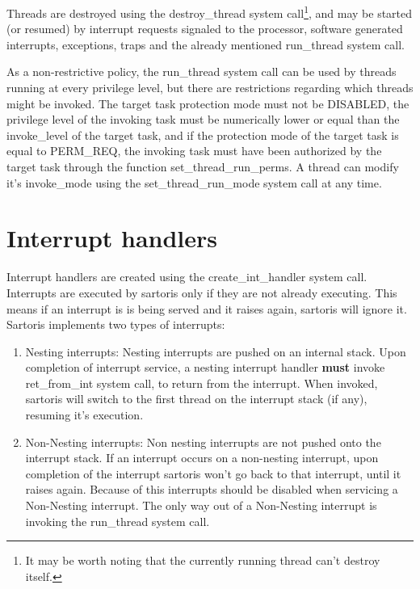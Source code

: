 \documentclass[11pt, letterpaper, twoside, english]{book}
\begin{document}
Threads are destroyed using the \textsf{destroy\_thread} system call\footnote{It may be worth noting that the currently running thread can't destroy itself.}, and may be started (or resumed) by interrupt requests signaled to the processor, software generated interrupts, exceptions, traps and the already mentioned \textsf{run\_thread} system call.

As a non-restrictive policy, the \textsf{run\_thread} system call can be used by threads running at every privilege level, but there are restrictions regarding which threads might be invoked. The target task protection mode must not be \textsf{DISABLED}, the privilege level of the invoking task must be numerically lower or equal than the \textsf{invoke\_level} of the target task, and if the protection mode of the target task is equal to \textsf{PERM\_REQ}, the invoking task must have been authorized by the target task through the function \textsf{set\_thread\_run\_perms}.
A thread can modify it's \textsf{invoke\_mode} using the \textsf{set\_thread\_run\_mode} system call at any time. 
       
\section{Interrupt handlers}
Interrupt handlers are created using the \textsf{create\_int\_handler} system call. Interrupts are executed by sartoris only if they are not already executing. This means if an interrupt is is being served and it raises again, sartoris will ignore it.\\

Sartoris implements two types of interrupts:

\begin{enumerate}
\item[]\textsf{Nesting interrupts}: Nesting interrupts are pushed on an internal stack. Upon completion of interrupt service, a \textsf{nesting} interrupt handler \textbf{must} invoke \textsf{ret\_from\_int} system call, to return from the interrupt. When invoked, sartoris will switch to the first thread on the interrupt stack (if any), resuming it's execution.
\item[]\textsf{Non-Nesting interrupts}: Non nesting interrupts are not pushed onto the interrupt stack. If an interrupt occurs on a non-nesting interrupt, upon completion of the interrupt sartoris won't go back to that interrupt, until it raises again. Because of this interrupts should be disabled when servicing a Non-Nesting interrupt.
The only way out of a Non-Nesting interrupt is invoking the \textsf{run\_thread} system call.
\end{enumerate} 
\end{document}
